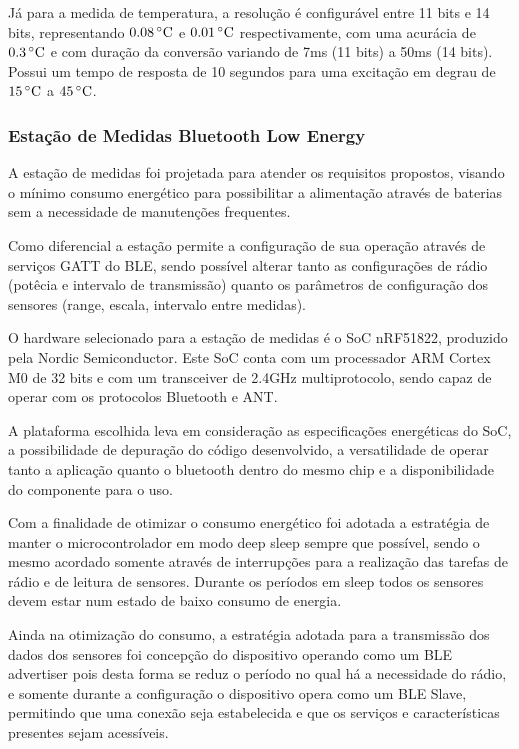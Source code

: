 Já para a medida de temperatura, a resolução é configurável entre 11 bits e 14
bits, representando $0.08\,^{\circ}{\rm C}$ e $0.01\,^{\circ}{\rm C}$
respectivamente, com uma acurácia de $0.3\,^{\circ}{\rm C}$ e com duração da
conversão variando de 7ms (11 bits) a 50ms (14 bits). Possui um tempo de
resposta de 10 segundos para uma excitação em degrau de $15\,^{\circ}{\rm C}$ a
$45\,^{\circ}{\rm C}$.\cite{HTU21DDatasheet}

\subsubsection{Estação de Medidas Bluetooth Low Energy}

A estação de medidas foi projetada para atender os requisitos propostos,
visando o mínimo consumo energético para possibilitar a alimentação através de
baterias sem a necessidade de manutenções frequentes.
 
Como diferencial a estação permite a configuração de sua operação através de
serviços GATT do BLE, sendo possível alterar tanto as configurações de rádio
(potêcia e intervalo de transmissão) quanto os parâmetros de configuração dos
sensores (range, escala, intervalo entre medidas).

O hardware selecionado para a estação de medidas é o SoC nRF51822, produzido
pela Nordic Semiconductor. Este SoC conta com um processador ARM Cortex M0 de 32
bits e com um transceiver de 2.4GHz multiprotocolo, sendo capaz de operar com
os protocolos Bluetooth e ANT.\cite{nRF51ProdSpec}

A plataforma escolhida leva em consideração as especificações energéticas do
SoC, a possibilidade de depuração do código desenvolvido, a versatilidade de
operar tanto a aplicação quanto o bluetooth dentro do mesmo chip e a
disponibilidade do componente para o uso.

Com a finalidade de otimizar o consumo energético foi adotada a estratégia de
manter o microcontrolador em modo deep sleep sempre que possível, sendo o mesmo
acordado somente através de interrupções para a realização das tarefas de rádio
e de leitura de sensores. Durante os períodos em sleep todos os sensores devem
estar num estado de baixo consumo de energia.

Ainda na otimização do consumo, a estratégia adotada para a transmissão dos
dados dos sensores foi concepção do dispositivo operando como um BLE advertiser
pois desta forma se reduz o período no qual há a necessidade do rádio, e
somente durante a configuração o dispositivo opera como um BLE Slave,
permitindo que uma conexão seja estabelecida e que os serviços e
características presentes sejam acessíveis.

